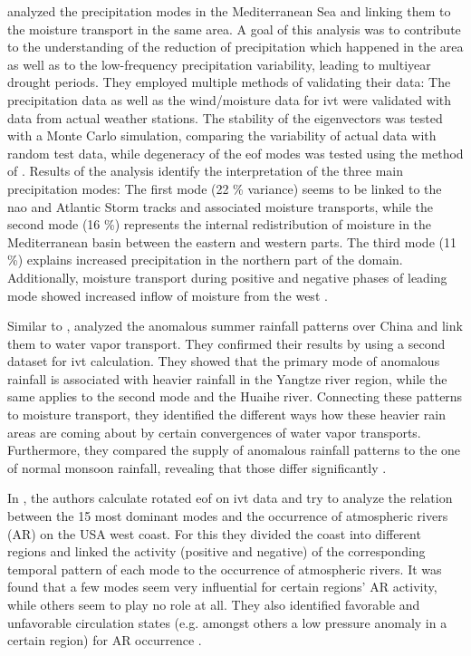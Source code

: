  


\citeauthor{fernandez_analysis_2003} analyzed the precipitation modes in the Mediterranean Sea and linking them to the moisture transport in the same area. 
A goal of this analysis was to contribute to the understanding of the reduction of precipitation which happened in the area as well as to the low-frequency precipitation variability, leading to multiyear drought periods.
They employed multiple methods of validating their data: The precipitation data as well as the wind/moisture data for \ac{ivt} were validated with data from actual weather stations. 
The stability of the eigenvectors was tested with a Monte Carlo simulation, comparing the variability of actual data with random test data, while degeneracy of the \ac{eof} modes was tested using the method of \citeauthor{north_sampling_1982} \cite{north_sampling_1982}. 
Results of the analysis identify the interpretation of the three main precipitation modes:
The first mode (22 \% variance) seems to be linked to the \ac{nao} and Atlantic Storm tracks and associated moisture transports, while the second mode (16 \%) represents the internal redistribution of moisture in the Mediterranean basin between the eastern and western parts.  
The third mode (11 \%) explains increased precipitation in the northern part of the domain. 
Additionally, moisture transport during positive and negative phases of leading mode showed increased inflow of moisture from the west \cite{fernandez_analysis_2003}. 



Similar to \cite{fernandez_analysis_2003}, \citeauthor{zhou_atmospheric_2005} analyzed the anomalous summer rainfall patterns over China and link them to water vapor transport. 
They confirmed their results by using a second dataset for \ac{ivt} calculation. 
They showed that the primary mode of anomalous rainfall is associated with heavier rainfall in the Yangtze river region, while the same applies to the second mode and the Huaihe river. 
Connecting these patterns to moisture transport, they identified the different ways how these heavier rain areas are coming about by certain convergences of water vapor transports. 
Furthermore, they compared the supply of anomalous rainfall patterns to the one of normal monsoon rainfall, revealing that those differ significantly \cite{zhou_atmospheric_2005}.


In \cite{guirguis_circulation_2018}, the authors calculate rotated \ac{eof} on \ac{ivt} data and try to analyze the relation between the 15 most dominant modes and the occurrence of atmospheric rivers (AR) on the USA west coast. 
For this they divided the coast into different regions and linked the activity (positive and negative) of the corresponding temporal pattern of each mode to the occurrence of atmospheric rivers. 
It was found that a few modes seem very influential for certain regions' AR activity, while others seem to play no role at all. 
They also identified favorable and unfavorable circulation states (e.g. amongst others a low pressure anomaly in a certain region) for AR occurrence \cite{guirguis_circulation_2018}. 


